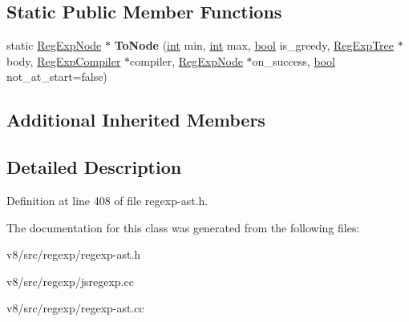 \subsection*{Static Public Member Functions}
\begin{DoxyCompactItemize}
\item 
\mbox{\label{classv8_1_1internal_1_1RegExpQuantifier_af74888630424746f820660fbfc63e0fe}} 
static \mbox{\hyperlink{classv8_1_1internal_1_1RegExpNode}{Reg\+Exp\+Node}} $\ast$ {\bfseries To\+Node} (\mbox{\hyperlink{classint}{int}} min, \mbox{\hyperlink{classint}{int}} max, \mbox{\hyperlink{classbool}{bool}} is\+\_\+greedy, \mbox{\hyperlink{classv8_1_1internal_1_1RegExpTree}{Reg\+Exp\+Tree}} $\ast$body, \mbox{\hyperlink{classv8_1_1internal_1_1RegExpCompiler}{Reg\+Exp\+Compiler}} $\ast$compiler, \mbox{\hyperlink{classv8_1_1internal_1_1RegExpNode}{Reg\+Exp\+Node}} $\ast$on\+\_\+success, \mbox{\hyperlink{classbool}{bool}} not\+\_\+at\+\_\+start=false)
\end{DoxyCompactItemize}
\subsection*{Additional Inherited Members}


\subsection{Detailed Description}


Definition at line 408 of file regexp-\/ast.\+h.



The documentation for this class was generated from the following files\+:\begin{DoxyCompactItemize}
\item 
v8/src/regexp/regexp-\/ast.\+h\item 
v8/src/regexp/jsregexp.\+cc\item 
v8/src/regexp/regexp-\/ast.\+cc\end{DoxyCompactItemize}

